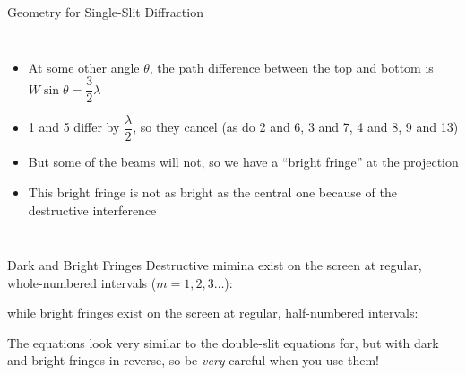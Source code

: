 \documentclass[12pt,compress,aspectratio=169]{beamer}
\begin{document}
\begin{frame}{Geometry for Single-Slit Diffraction}
  \begin{columns}

    \begin{itemize}
    \item At some other angle $\theta$, the path difference between the top
      and bottom is $W\sin\theta=\dfrac32\lambda$
    \item 1 and 5 differ by $\dfrac{\lambda}2$, so they cancel (as do 2 and 6,
      3 and 7, 4 and 8, 9 and 13)
    \item But some of the beams will not, so we have a ``bright fringe'' at the 
      projection
    \item This bright fringe is not as bright as the central one because
      of the destructive interference
    \end{itemize}
  \end{columns}
\end{frame}



\begin{frame}{Dark and Bright Fringes}
  Destructive mimina exist on the screen at regular, whole-numbered intervals
  ($m=1,2,3\ldots$):


  while bright fringes exist on the screen at regular, half-numbered intervals:


  The equations look very similar to the double-slit equations for, but with
  dark and bright fringes in reverse, so be \emph{very} careful when you use
  them!
\end{frame}
\end{document}
